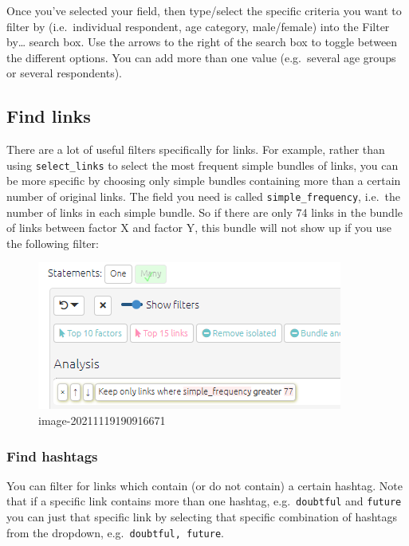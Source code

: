 \documentclass[
]{book}
\begin{document}
Once you've selected your field, then type/select the specific criteria you want to filter by (i.e.~individual respondent, age category, male/female) into the Filter by\ldots{} search box. Use the arrows to the right of the search box to toggle between the different options. You can add more than one value (e.g.~several age groups or several respondents).

\hypertarget{find-links}{%
\subsection{Find links}\label{find-links}}

There are a lot of useful filters specifically for links. For example, rather than using \texttt{select\_links} to select the most frequent simple bundles of links, you can be more specific by choosing only simple bundles containing more than a certain number of original links. The field you need is called \texttt{simple\_frequency}, i.e.~the number of links in each simple bundle. So if there are only 74 links in the bundle of links between factor X and factor Y, this bundle will not show up if you use the following filter:

\begin{figure}
\centering
\includegraphics{_assets/image-20211119190916671.png}
\caption{image-20211119190916671}
\end{figure}

\hypertarget{find-hashtags}{%
\subsubsection{Find hashtags}\label{find-hashtags}}

You can filter for links which contain (or do not contain) a certain hashtag. Note that if a specific link contains more than one hashtag, e.g.~\texttt{doubtful} and \texttt{future} you can just that specific link by selecting that specific combination of hashtags from the dropdown, e.g.~\texttt{doubtful,\ future}.
\end{document}
